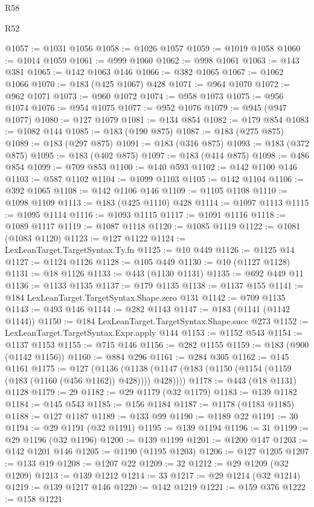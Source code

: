 \begin{lexlean}{R58}
\begin{lexlean}{R52}
\begin{coremodule}
{{{{{{{{{{{{{{{{{{{{{{{{{{{{{{{{{{{{{{{{{{{{{{{{{{{{{{{{{{{{{{{{{{{{{{{{{{{{{{{{{{{{{{{{{{{{{{{{{{{{{{{{{{{{{{{{{{{{{{{{{{{{{{{{{{{{{{{{{{{{{{{{{{{{{{{{{{{{{{{{{{{{{{{{{{{{{{{{{{{{{{{{{{{{{{{{{{{{{{@1057 := @1031 @1056
@1058 := @1026 @1057
@1059 := @1019 @1058
@1060 := @1014 @1059
@1061 := @999 @1060
@1062 := @998 @1061
@1063 := @143 @381
@1065 := @142 @1063 @146
@1066 := @382 @1065
@1067 := @1062 @1066
@1070 := @183 (@425 @1067) @428
@1071 := @964 @1070
@1072 := @962 @1071
@1073 := @960 @1072
@1074 := @958 @1073
@1075 := @956 @1074
@1076 := @954 @1075
@1077 := @952 @1076
@1079 := @945 (@947 @1077)
@1080 := @127 @1079
@1081 := @134 @854
@1082 := @179 @854
@1083 := @1082 @144
@1085 := @183 (@190 @875)
@1087 := @183 (@275 @875)
@1089 := @183 (@297 @875)
@1091 := @183 (@316 @875)
@1093 := @183 (@372 @875)
@1095 := @183 (@402 @875)
@1097 := @183 (@414 @875)
@1098 := @486 @854
@1099 := @709 @853
@1100 := @140 @593
@1102 := @142 @1100 @146
@1103 := @587 @1102
@1104 := @1099 @1103
@1105 := @142 @1104
@1106 := @392 @1065
@1108 := @142 @1106 @146
@1109 := @1105 @1108
@1110 := @1098 @1109
@1113 := @183 (@425 @1110) @428
@1114 := @1097 @1113
@1115 := @1095 @1114
@1116 := @1093 @1115
@1117 := @1091 @1116
@1118 := @1089 @1117
@1119 := @1087 @1118
@1120 := @1085 @1119
@1122 := @1081 (@1083 @1120)
@1123 := @127 @1122
@1124 := LexLeanTarget.TargetSyntax.Ty.fn
@1125 := @10 @449
@1126 := @1125 @14
@1127 := @1124 @1126
@1128 := @105 @449
@1130 := @10 (@1127 @1128)
@1131 := @18 @1126
@1133 := @443 (@1130 @1131)
@1135 := @692 @449 @11
@1136 := @1133 @1135
@1137 := @179 @1135
@1138 := @1137 @155
@1141 := @184 LexLeanTarget.TargetSyntax.Shape.zero @131
@1142 := @709 @1135
@1143 := @493 @146
@1144 := @282 @1143
@1147 := @183 (@1141 (@1142 @1144))
@1150 := @184 LexLeanTarget.TargetSyntax.Shape.succ @273
@1152 := LexLeanTarget.TargetSyntax.Expr.apply @144
@1153 := @1152 @543
@1154 := @1137 @1153
@1155 := @715 @146
@1156 := @282 @1155
@1159 := @183 (@900 (@1142 @1156))
@1160 := @884 @296
@1161 := @284 @305
@1162 := @145 @1161
@1175 := @127
    (@1136 (@1138 (@1147 (@183 (@1150 (@1154 (@1159 (@183 (@1160 (@456 @1162)) @428)))) @428))))
@1178 := @443 (@18 @1131) @1128
@1179 := 29
@1182 := @29 @1179 (@32 @1179)
@1183 := @139 @1182
@1184 := @145 @543
@1185 := @156 @1184
@1187 := @1178 (@1183 @1185)
@1188 := @127 @1187
@1189 := @133 @99
@1190 := @1189 @22
@1191 := 30
@1194 := @29 @1191 (@32 @1191)
@1195 := @139 @1194
@1196 := 31
@1199 := @29 @1196 (@32 @1196)
@1200 := @139 @1199
@1201 := @1200 @147
@1203 := @142 @1201 @146
@1205 := @1190 (@1195 @1203)
@1206 := @127 @1205
@1207 := @133 @19
@1208 := @1207 @22
@1209 := 32
@1212 := @29 @1209 (@32 @1209)
@1213 := @139 @1212
@1214 := 33
@1217 := @29 @1214 (@32 @1214)
@1219 := @139 @1217 @146
@1220 := @142 @1219
@1221 := @159 @376
@1222 := @158 @1221
}}}}}}}}}}}}}}}}}}}}}}}}}}}}}}}}}}}}}}}}}}}}}}}}}}}}}}}}}}}}}}}}}}}}}}}}}}}}}}}}}}}}}}}}}}}}}}}}}}}}}}}}}}}}}}}}}}}}}}}}}}}}}}}}}}}}}}}}}}}}}}}}}}}}}}}}}}}}}}}}}}}}}}}}}}}}}}}}}}}}}}}}}}}}}}}}}}}}}}
\end{coremodule}
\end{lexlean}
\end{lexlean}
